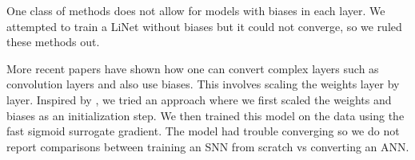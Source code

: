 \documentclass[../taasin.tex]{subfiles}
\begin{document}
One class of methods does not allow for models with biases in each layer. We attempted to train a LiNet without biases but it could not converge, so we ruled these methods out.

More recent papers have shown how one can convert complex layers such as convolution layers and also use biases. This involves scaling the weights layer by layer. Inspired by \cite{rathi2020enabling}, we tried an approach where we first scaled the weights and biases as an initialization step. We then trained this model on the data using the fast sigmoid surrogate gradient. The model had trouble converging so we do not report comparisons between training an SNN from scratch vs converting an ANN.


\end{document}

